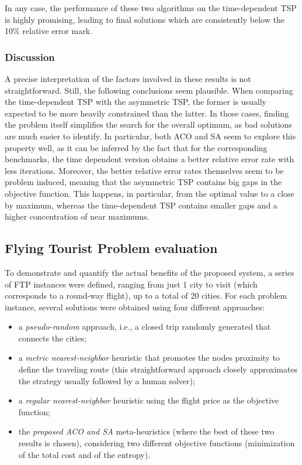 \documentclass[onecolumn]{elsarticle}
\begin{document}
In any case, the performance of these two algorithms on the time-dependent TSP is highly promising, leading to final solutions which are consistently below the 10\% relative error mark. 


\subsubsection{Discussion}

A precise interpretation of the factors involved in these results is not straightforward. Still, the following conclusions seem plausible. When comparing the time-dependent TSP with the asymmetric TSP, the former is usually expected to be more heavily constrained than the latter. In those cases, finding the problem itself simplifies the search for the overall optimum, as bad solutions are much easier to identify. In particular, both ACO and SA seem to explore this property well, as it can be inferred by the fact that for the corresponding benchmarks, the time dependent version obtains a better relative error rate with less iterations. Moreover, the better relative error rates themselves seem to be problem induced, meaning that the asymmetric TSP contains big gaps in the objective function. This happens, in particular, from the optimal value to a close by maximum, whereas the time-dependent TSP contains smaller gaps and a higher concentration of near maximums.


\subsection{Flying Tourist Problem evaluation}

To demonstrate and quantify the actual benefits of the proposed system, a series of FTP instances were defined, ranging from just 1 city to visit (which corresponds to a round-way flight), up to a total of 20 cities. For each problem instance, several solutions were obtained using four different approaches:
\begin{itemize}
    \item a \textit{pseudo-random} approach, i.e., a closed trip randomly generated that connects the cities;
    \item a \textit{metric nearest-neighbor} heuristic that promotes the nodes proximity to define the traveling route (this straightforward approach closely approximates the strategy usually followed by a human solver);
    \item a \textit{regular nearest-neighbor} heuristic using the flight price as the objective function;
    \item the \textit{proposed ACO and SA} meta-heuristics (where the best of these two results is chosen), considering two different objective functions (minimization of the total cost and of the entropy).
\end{itemize}  
\end{document}
